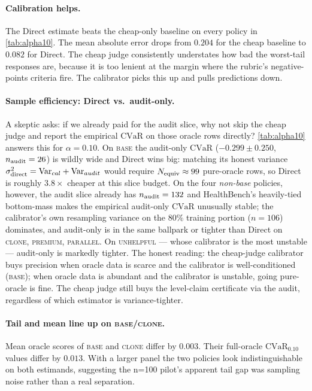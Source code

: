 \documentclass[11pt]{article}
\newcommand{\CVaR}{\mathrm{CVaR}}
\begin{document}
\paragraph{Calibration helps.}
The Direct estimate beats the cheap-only baseline on every policy in
\cref{tab:alpha10}. The mean absolute error drops from $0.204$ for the
cheap baseline to $0.082$ for Direct. The cheap judge consistently
understates how bad the worst-tail responses are, because it is too
lenient at the margin where the rubric's negative-points criteria fire.
The calibrator picks this up and pulls predictions down.

\paragraph{Sample efficiency: Direct vs.\ audit-only.}
A skeptic asks: if we already paid for the audit slice, why not skip
the cheap judge and report the empirical $\CVaR$ on those oracle rows
directly? \cref{tab:alpha10} answers this for $\alpha = 0.10$. On
\textsc{base} the audit-only $\CVaR$ ($-0.299 \pm 0.250$, $n_{\rm audit}
= 26$) is wildly wide and Direct wins big: matching its honest variance
$\sigma_{\rm direct}^2 = \mathrm{Var}_{cal} + \mathrm{Var}_{audit}$
would require $N_{\rm equiv} \approx 99$ pure-oracle rows, so Direct is
roughly $3.8\times$ cheaper at this slice budget. On the four
\emph{non-base} policies, however, the audit slice already has
$n_{\rm audit} = 132$ and HealthBench's heavily-tied bottom-mass makes
the empirical audit-only $\CVaR$ unusually stable; the calibrator's
own resampling variance on the $80\%$ training portion ($n = 106$)
dominates, and audit-only is in the same ballpark or tighter than
Direct on \textsc{clone}, \textsc{premium}, \textsc{parallel}. On
\textsc{unhelpful} — whose calibrator is the most unstable — audit-only
is markedly tighter. The honest reading: the cheap-judge calibrator
buys precision when oracle data is scarce and the calibrator is
well-conditioned (\textsc{base}); when oracle data is abundant and the
calibrator is unstable, going pure-oracle is fine. The cheap judge
still buys the level-claim certificate via the audit, regardless of
which estimator is variance-tighter.

\paragraph{Tail and mean line up on \textsc{base}/\textsc{clone}.}
Mean oracle scores of \textsc{base} and \textsc{clone} differ by
$0.003$. Their full-oracle $\CVaR_{0.10}$ values differ by $0.013$.
With a larger panel the two policies look indistinguishable on both
estimands, suggesting the n=100 pilot's apparent tail gap was
sampling noise rather than a real separation.
\end{document}
